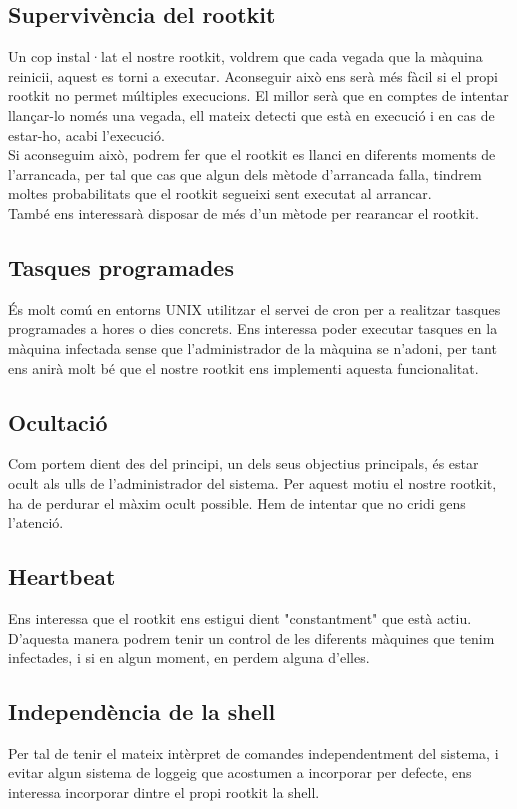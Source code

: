 \subsection{Supervivència del rootkit}
Un cop instal·lat el nostre rootkit, voldrem que cada vegada que la màquina reinicii, aquest es torni a executar. 
Aconseguir això ens serà més fàcil si el propi rootkit no permet múltiples execucions. El millor serà que en comptes
de intentar llançar-lo només una vegada, ell mateix detecti que està en execució i en cas de estar-ho, acabi l'execució. \\

Si aconseguim això, podrem fer que el rootkit es llanci en diferents moments de l'arrancada, per tal que cas que algun dels mètode 
d'arrancada falla, tindrem moltes probabilitats que el rootkit segueixi sent executat al arrancar. \\

També ens interessarà disposar de més d'un mètode per rearancar el rootkit.

\subsection{Tasques programades}
És molt comú en entorns UNIX utilitzar el servei de cron per a realitzar tasques programades a hores o dies concrets. Ens interessa
poder executar tasques en la màquina infectada sense que l'administrador de la màquina se n'adoni, per tant ens anirà molt bé que 
el nostre rootkit ens implementi aquesta funcionalitat.

\subsection{Ocultació}
Com portem dient des del principi, un dels seus objectius principals, és estar ocult als ulls de l'administrador del sistema. Per aquest motiu el 
nostre rootkit, ha de perdurar el màxim ocult possible. Hem de intentar que no cridi gens l'atenció.

\subsection{Heartbeat}
Ens interessa que el rootkit ens estigui dient "constantment" que està actiu. D'aquesta manera podrem tenir un control de les diferents
màquines que tenim infectades, i si en algun moment, en perdem alguna d'elles.

\subsection{Independència de la shell}
Per tal de tenir el mateix intèrpret de comandes independentment del sistema, i evitar algun sistema de loggeig que acostumen a 
incorporar per defecte, ens interessa incorporar dintre el propi rootkit la shell.

